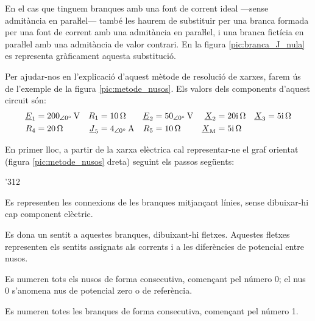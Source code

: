 En el cas que tinguem branques amb una font de corrent ideal ---sense admitància en paraŀlel---  també les haurem de substituir per una branca  formada per una font de corrent amb una admitància en paraŀlel, i una branca fictícia en paraŀlel amb una admitància de valor contrari. En la figura \vref{pic:branca_J_nula} es representa gràficament aquesta substitució.
\begin{center}
	
	\label{pic:branca_J_nula}
\end{center}

Per ajudar-nos en l'explicació d'aquest mètode de resolució de xarxes, farem
ús de l'exemple de la figura \vref{pic:metode_nusos}. Els valors dels components d'aquest
circuit són:
\begin{align*}
   \cmplx{E}_1 &= \qtypd{200}{0}{V} & R_1 &= \qty{10}{\ohm} &
   \cmplx{E}_2 &= \qtypd{50}{0}{V}  & \cmplx{X}_2 &= \complexqty{j20}{\ohm} &
   \cmplx{X}_3 &= \complexqty{j5}{\ohm} \\
   R_4 &= \qty{20}{\ohm} & \cmplx{J}_5 &= \qtypd{4}{0}{A} &
   R_5 &= \qty{10}{\ohm} & \cmplx{X}\ped{M} &= \complexqty{j5}{\ohm}
\end{align*}

\begin{center}
\vspace{-4mm}
    
    \label{pic:metode_nusos}
\end{center}

En primer lloc, a partir de la xarxa elèctrica
cal representar-ne el graf orientat (figura \vref{pic:metode_nusos} dreta) seguint els passos següents:
\begin{dingautolist}{'312}
   \item Es representen les connexions de les branques mitjançant línies, sense dibuixar-hi cap component elèctric.
   \item Es dona un sentit a aquestes branques, dibuixant-hi fletxes. Aquestes fletxes representen els sentits assignats als corrents i a les diferències de potencial entre nusos.
   \item Es numeren tots els nusos de forma consecutiva, començant pel número 0; el nus 0 s'anomena nus de potencial zero o de referència.
   \item Es numeren totes les branques de forma consecutiva, començant pel número 1.
\end{dingautolist}

